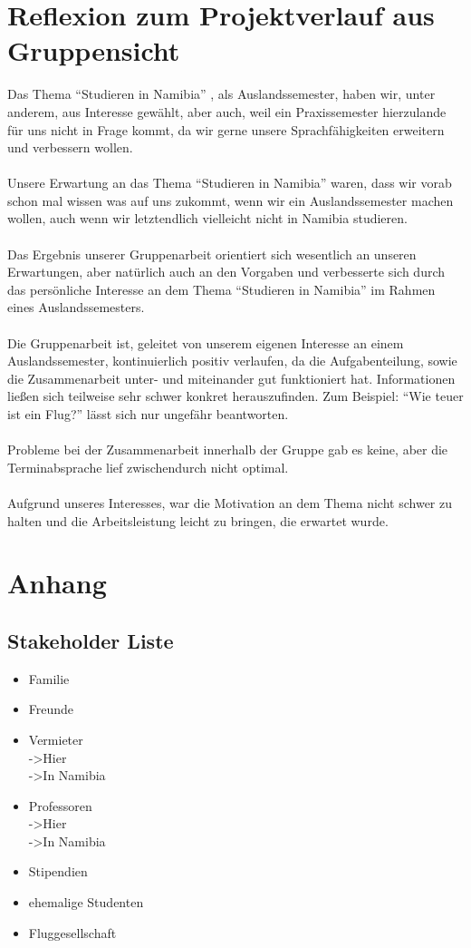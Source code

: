 \documentclass[11pt]{article}
\begin{document}
\section{Reflexion zum Projektverlauf aus Gruppensicht}
Das Thema "`Studieren in Namibia"' , als Auslandssemester, haben wir, unter anderem, 
aus Interesse gewählt, aber auch, weil ein Praxissemester hierzulande für uns nicht 
in Frage kommt, da wir gerne unsere Sprachfähigkeiten erweitern und verbessern wollen.
\\\\
Unsere Erwartung an das Thema "`Studieren in Namibia"' waren, dass wir vorab schon mal
wissen was auf uns zukommt, wenn wir ein Auslandssemester machen wollen, auch
wenn wir letztendlich vielleicht nicht in Namibia studieren.
\\\\
Das Ergebnis unserer Gruppenarbeit orientiert sich wesentlich an unseren Erwartungen,
aber natürlich auch an den Vorgaben und verbesserte sich durch das persönliche Interesse
an dem Thema "`Studieren in Namibia"' im Rahmen eines Auslandssemesters.
\\\\
Die Gruppenarbeit ist, geleitet von unserem eigenen Interesse an einem Auslandssemester,
kontinuierlich positiv verlaufen, da die Aufgabenteilung, sowie die Zusammenarbeit
unter- und miteinander gut funktioniert hat.
Informationen ließen sich teilweise sehr schwer konkret herauszufinden.
Zum Beispiel: "`Wie teuer ist ein Flug?"' lässt sich nur ungefähr beantworten.
\\\\
Probleme bei der Zusammenarbeit innerhalb der Gruppe gab es keine, aber die 
Terminabsprache lief zwischendurch nicht optimal.
\\\\
Aufgrund unseres Interesses, war die Motivation an dem Thema nicht schwer zu halten
und die Arbeitsleistung leicht zu bringen, die erwartet wurde.

\newpage

\section{Anhang}
\subsection{Stakeholder Liste}
\begin{itemize}
\item Familie
\item Freunde
\item Vermieter
	\\->Hier
	\\->In Namibia
\item Professoren
	\\->Hier
	\\->In Namibia
\item Stipendien
\item ehemalige Studenten
\item Fluggesellschaft
\end{itemize}
\end{document}
